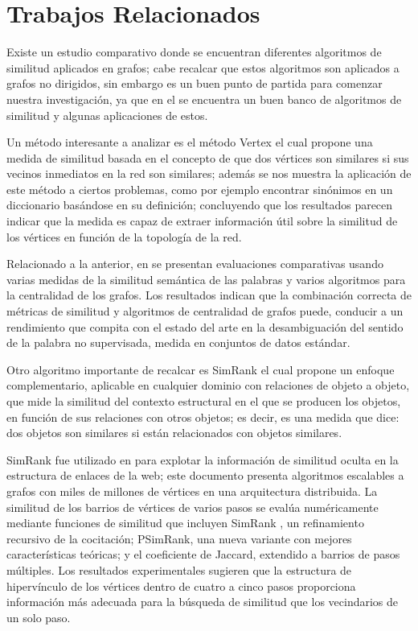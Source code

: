 \newpage
\section{Trabajos Relacionados}
Existe un  estudio comparativo \cite{lu2011link} donde se encuentran diferentes algoritmos de similitud aplicados en grafos; cabe recalcar que estos  algoritmos son aplicados a grafos no dirigidos, sin embargo es un buen punto de partida para comenzar nuestra investigación, ya que en el se encuentra un buen banco de algoritmos de similitud  y algunas aplicaciones de estos.    

Un método  interesante a analizar es el  método Vertex \cite{leicht2006vertex} el cual propone  una medida de similitud basada en el concepto de que dos vértices son similares si sus vecinos inmediatos en la red son similares; además se nos muestra la aplicación de este método a ciertos problemas, como por ejemplo  encontrar sinónimos en un diccionario basándose en su definición; concluyendo que los  resultados parecen indicar que la medida es capaz de extraer información útil sobre la similitud de los vértices en función de la topología de la red.

Relacionado a la anterior, en  \cite{sinha2007unsupervised} se presentan evaluaciones comparativas usando varias medidas de la similitud semántica de las palabras y varios algoritmos para la centralidad de los grafos. Los  resultados indican que la combinación correcta de métricas de similitud y algoritmos de centralidad de grafos puede, conducir a un rendimiento que compita con el estado del arte en la desambiguación del sentido de la palabra no supervisada, medida en conjuntos de datos estándar.

Otro algoritmo importante de recalcar es SimRank \cite{jeh2002simrank}  el cual propone un enfoque complementario, aplicable en cualquier dominio con relaciones de objeto a objeto, que mide la similitud del contexto estructural en el que se producen los objetos, en función de sus relaciones con otros objetos; es decir, es  una medida que dice: dos objetos son similares si están relacionados con objetos similares.

SimRank fue utilizado en \cite{fogaras2005scaling} para explotar la información de similitud oculta en la estructura de enlaces de la web; este documento presenta algoritmos escalables a grafos con miles de millones de vértices en una arquitectura distribuida. La similitud de los barrios de vértices de varios pasos se evalúa numéricamente mediante funciones de similitud que incluyen SimRank , un refinamiento recursivo de la cocitación; PSimRank, una nueva variante con mejores características teóricas; y el coeficiente de Jaccard, extendido a barrios de pasos múltiples. Los resultados experimentales sugieren que la estructura de hipervínculo de los vértices dentro de cuatro a cinco pasos proporciona información más adecuada para la búsqueda de similitud que los vecindarios de un solo paso.

